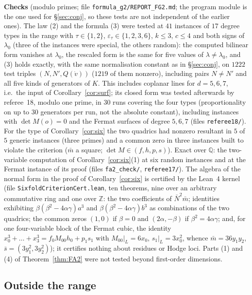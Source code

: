 \documentclass[11pt]{article}
\numberwithin{equation}{section}
\theoremstyle{remark}
\newcommand{\QQ}{\mathbb{Q}}
\newcommand{\ZZ}{\mathbb{Z}}
\newcommand{\lz}{\lambda_0}
\newcommand{\et}{\varepsilon_\tau}
\newcommand{\run}[1]{\medskip\noindent\textbf{#1}}
\begin{document}
\run{Checks} (modulo primes; file \texttt{formula\_g2/REPORT\_FG2.md}; the program module is the one used for
\S\ref{sec:conj}, so these tests are not independent of the earlier ones). The law (2) and the formula (3) were
tested at $41$ instances of $17$ degree types in the range with $\tau\in\{1,2\}$, $\et\in\{1,2,3,6\}$,
$k\le3$, $c\le4$ and both signs of $\lz$ (three of the instances were special, the others random): the computed bilinear form
vanishes at $\lz$, the rescaled form is the same for five values of $\lambda\ne\lz$, and (3) holds exactly, with
the same normalisation constant as in \S\ref{sec:conj}, on $1222$ test triples $(N,N',Q(\dot v))$ ($1219$ of them
nonzero), including pairs $N\ne N'$ and all five kinds of generators of $K$. This includes coplanar lines for
$d=5,6,7$, i.e.\ the input of Corollary~\ref{cor:surf}; its closed form was tested afterwards by referee~18, modulo one
prime, in $30$ runs covering the four types (proportionality on up to $30$ generators per run, not the absolute
constant), including instances with $\det M(o)=0$ and the Fermat surfaces of degree $5,6,7$ (files
\texttt{referee18/}).
For the type of Corollary~\ref{cor:six} the two quadrics had nonzero resultant in $5$ of $5$ generic instances
(three primes) and a common zero in three instances built to violate the criterion ($\bar m$ a square;
$\det M\in(f,h,p,s)$). Exact over $\QQ$: the two-variable computation of Corollary~\ref{cor:six}(1) at six random
instances and at the Fermat instance of its proof (files \texttt{fa2\_check/}, \texttt{referee17/}). The
algebra of the normal form in the proof of Corollary~\ref{cor:six} is certified by the Lean~4 kernel (file
\texttt{SixfoldCriterionCert.lean}, ten theorems, nine over an arbitrary commutative ring and one over $\ZZ$: the two coefficients of
$\bar N^2\bar m$; identities exhibiting $\beta(\beta^2-4\alpha\gamma)a^3$ and $\beta(\beta^2-4\alpha\gamma)b^3$ as
combinations of the two quadrics; the common zeros $(1,0)$ if $\beta=0$ and $(2\alpha,-\beta)$ if
$\beta^2=4\alpha\gamma$; and, for one four-variable block of the Fermat cubic, the identity $x_0^3+\dots+x_3^3=f_0M_{00}h_0+p_1s_1$ with
$M_{00}|_L=6x_0$, $s_1|_L=3x_0^2$, whence $\bar m=36y_1y_2$, $\bar s=(3y_1^2,3y_2^2)$); it certifies nothing about
residues or Hodge loci. Parts (1)
and (4) of Theorem~\ref{thm:FA2} were not tested beyond first-order dimensions.


\subsection{Outside the range}\label{sec:FA3}
\end{document}
